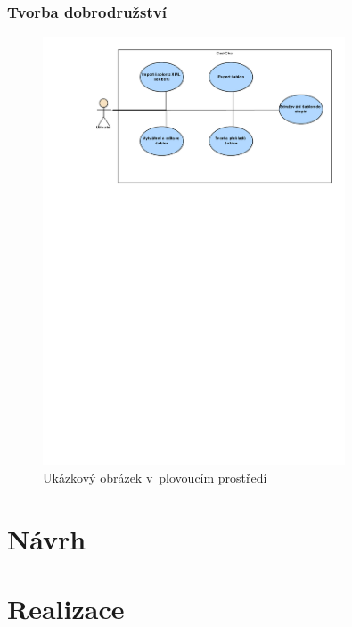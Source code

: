 \documentclass[thesis=B,czech]{resources/FITthesis}[2012/06/26]
\begin{document}
\subsection{Tvorba dobrodružství}
\begin{figure}\centering
	\includegraphics[width=0.8\textwidth]{images/usecase_sablony}
	\caption[Usecase šablony]{Ukázkový obrázek v~plovoucím prostředí}\label{fig:uc_sablony}
\end{figure}



\chapter{Návrh}

\chapter{Realizace}

\begin{conclusion}
\end{conclusion}



\end{document}
